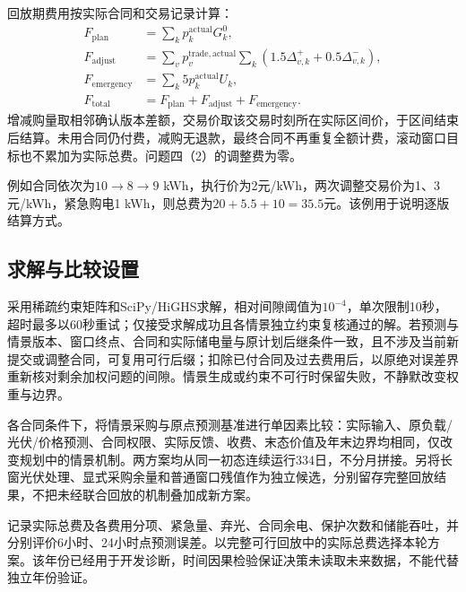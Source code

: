回放期费用按实际合同和交易记录计算：
\begin{align}
 F_{\mathrm{plan}}&=\sum_kp_k^{\mathrm{actual}}G_k^0,\\
 F_{\mathrm{adjust}}&=\sum_vp_v^{\mathrm{trade,actual}}\sum_k(1.5\Delta_{v,k}^++0.5\Delta_{v,k}^-),\\
 F_{\mathrm{emergency}}&=\sum_k5p_k^{\mathrm{actual}}U_k,\\
 F_{\mathrm{total}}&=F_{\mathrm{plan}}+F_{\mathrm{adjust}}+F_{\mathrm{emergency}}.
\end{align}
增减购量取相邻确认版本差额，交易价取该交易时刻所在实际区间价，于区间结束后结算。未用合同仍付费，减购无退款，最终合同不再重复全额计费，滚动窗口目标也不累加为实际总费。问题四（2）的调整费为零。

例如合同依次为$10\to8\to9$ kWh，执行价为2元/kWh，两次调整交易价为1、3元/kWh，紧急购电1 kWh，则总费为$20+5.5+10=35.5$元。该例用于说明逐版结算方式。

\subsection{求解与比较设置}
采用稀疏约束矩阵和SciPy/HiGHS求解，相对间隙阈值为$10^{-4}$，单次限制10秒，超时最多以60秒重试；仅接受求解成功且各情景独立约束复核通过的解。若预测与情景版本、窗口终点、合同和实际储电量与原计划后继条件一致，且不涉及当前新提交或调整合同，可复用可行后缀；扣除已付合同及过去费用后，以原绝对误差界重新核对剩余加权问题的间隙。情景生成或约束不可行时保留失败，不静默改变权重与边界。

各合同条件下，将情景采购与原点预测基准进行单因素比较：实际输入、原负载/光伏/价格预测、合同权限、实际反馈、收费、末态价值及年末边界均相同，仅改变规划中的情景机制。两方案均从同一初态连续运行334日，不分月拼接。另将长窗光伏处理、显式采购余量和普通窗口残值作为独立候选，分别留存完整回放结果，不把未经联合回放的机制叠加成新方案。

记录实际总费及各费用分项、紧急量、弃光、合同余电、保护次数和储能吞吐，并分别评价6小时、24小时点预测误差。以完整可行回放中的实际总费选择本轮方案。该年份已经用于开发诊断，时间因果检验保证决策未读取未来数据，不能代替独立年份验证。

\FloatBarrier
